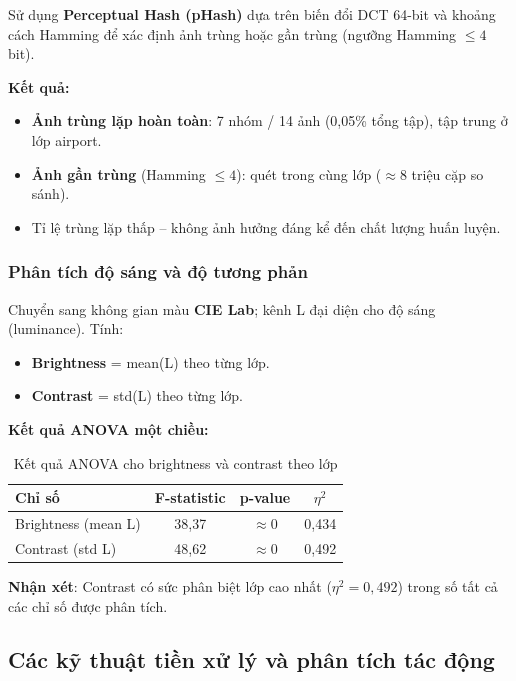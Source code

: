 \documentclass[12pt,a4paper]{article}
\let\oldtextbf\textbf
\renewcommand{\textbf}[1]{\oldtextbf{\textcolor{hcmublue}{#1}}}
\begin{document}
Sử dụng \textbf{Perceptual Hash (pHash)} dựa trên biến đổi DCT 64-bit và khoảng cách Hamming để xác định ảnh trùng hoặc gần trùng (ngưỡng Hamming $\leq 4$ bit).

\textbf{Kết quả:}
\begin{itemize}
    \item \textbf{Ảnh trùng lặp hoàn toàn}: 7 nhóm / 14 ảnh (0,05\% tổng tập), tập trung ở lớp airport.
    \item \textbf{Ảnh gần trùng} (Hamming $\leq 4$): quét trong cùng lớp ($\approx 8$ triệu cặp so sánh).
    \item Tỉ lệ trùng lặp thấp -- không ảnh hưởng đáng kể đến chất lượng huấn luyện.
\end{itemize}

\subsubsection{Phân tích độ sáng và độ tương phản}

Chuyển sang không gian màu \textbf{CIE Lab}; kênh L đại diện cho độ sáng (luminance). Tính:
\begin{itemize}
    \item \textbf{Brightness} = mean(L) theo từng lớp.
    \item \textbf{Contrast} = std(L) theo từng lớp.
\end{itemize}

\textbf{Kết quả ANOVA một chiều:}
\begin{table}[H]
\centering
\begin{tabular}{|l|c|c|c|}
\hline
\textbf{Chỉ số} & \textbf{F-statistic} & \textbf{p-value} & \textbf{$\eta^2$} \\ \hline
Brightness (mean L) & 38,37 & $\approx 0$ & 0,434 \\ \hline
Contrast (std L) & 48,62 & $\approx 0$ & 0,492 \\ \hline
\end{tabular}
\caption{Kết quả ANOVA cho brightness và contrast theo lớp}
\label{tab:img_anova_bc}
\end{table}

\textbf{Nhận xét}: Contrast có sức phân biệt lớp cao nhất ($\eta^2 = 0{,}492$) trong số tất cả các chỉ số được phân tích.

\subsection{Các kỹ thuật tiền xử lý và phân tích tác động}
\end{document}
